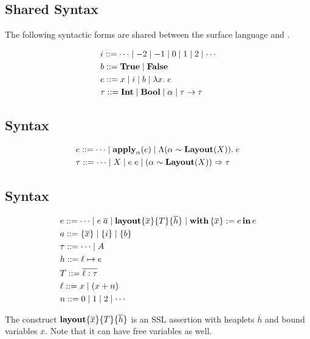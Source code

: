 \subsection{Shared Syntax}

The following syntactic forms are shared between the \Pika{} surface language and \PikaCore.

\begin{align*}
  &i ::= \cdots \mid -2 \mid -1 \mid 0 \mid 1 \mid 2 \mid \cdots
  \\
  &b ::= \textbf{True}{} \mid \textbf{False}
  \\
  &e ::= x \mid i \mid b \mid \lambda x.\; e
  \\
  &\tau ::= \textbf{Int} \mid \textbf{Bool} \mid \alpha \mid \tau \rightarrow \tau
\end{align*}

\subsection{\Pika{} Syntax}
\begin{align*}
  &e ::= \cdots \mid \textbf{apply}_{\alpha}(e) \mid \Lambda (\alpha \sim \textbf{Layout}(X)).\; e
  \\
  &\tau ::= \cdots \mid X \mid e\; e \mid (\alpha \sim \textbf{Layout}(X)) \Rightarrow \tau
\end{align*}

\subsection{\PikaCore{} Syntax}
\begin{align*}
  &e ::= \cdots \mid e\; \overline{a} \mid \textbf{layout}\{ \overline{x} \}\{ T \}\{ \overline{h} \} \mid \textbf{with}\,\{ \overline{x} \} := e\,\textbf{in}\, e
  \\
  &a ::= \{ \overline{x} \} \mid \{ i \} \mid \{ b \}
  \\
  &\tau ::= \cdots \mid A
  \\
  &h ::= \ell \mapsto e
  \\
  &T ::= \overline{\ell : \tau}
  \\
  &\ell ::= x \mid (x + n)
  \\
  &n ::= 0 \mid 1 \mid 2 \mid \cdots
\end{align*}

The construct $\textbf{layout}\{ \overline{x} \}\{ T \}\{ \overline{h} \}$ is an SSL assertion with heaplets $\overline{h}$ and
bound variables $\overline{x}$. Note that it can have free variables as well.

